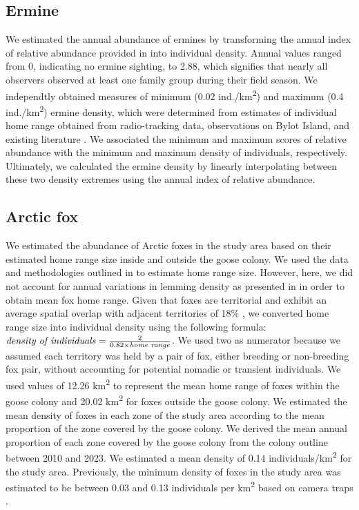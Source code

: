 \documentclass[a4paper,twoside,10pt]{article}
\begin{document}
\subsection{Ermine}
We estimated the annual abundance of ermines by transforming the annual index of relative abundance provided in \citet{bolduc2023} into individual density. Annual values ranged from 0, indicating no ermine sighting, to 2.88, which signifies that nearly all observers observed at least one family group during their field season. We independtly obtained measures of minimum (0.02 ind./km\textsuperscript{2}) and maximum (0.4 ind./km\textsuperscript{2}) ermine density, which were determined from estimates of individual home range obtained from radio-tracking data, observations on Bylot Island, and existing literature \citep{legagneux2012, bilodeau2013}. We associated the minimum and maximum scores of relative abundance with the minimum and maximum density of individuals, respectively. Ultimately, we calculated the ermine density by linearly interpolating between these two density extremes using the annual index of relative abundance. 

\subsection{Arctic fox} 
We estimated the abundance of Arctic foxes in the study area based on their estimated home range size inside and outside the goose colony. We used the data and methodologies outlined in \citet{dulude2023} to estimate home range size. However, here, we did not account for annual variations in lemming density as presented in \citet{dulude2023} in order to obtain mean fox home range. Given that foxes are territorial and exhibit an average spatial overlap with adjacent territories of 18\% \citep{clermont2021}, we converted home range size into individual density using the following formula: $\text{\textit{density of individuals}}= \frac{2}{0.82\times \text{\textit{home range}}}$. We used two as numerator because we assumed each territory was held by a pair of fox, either breeding or non-breeding fox pair, without accounting for potential nomadic or transient individuals. We used values of 12.26 km\textsuperscript{2} to represent the mean home range of foxes within the goose colony and 20.02 km\textsuperscript{2} for foxes outside the goose colony. We estimated the mean density of foxes in each zone of the study area according to the mean proportion of the zone covered by the goose colony. We derived the mean annual proportion of each zone covered by the goose colony from the colony outline between 2010 and 2023. We estimated a mean density of 0.14 individuals/km\textsuperscript{2} for the study area. Previously, the minimum density of foxes in the study area was estimated to be between 0.03 and 0.13 individuals per km\textsuperscript{2} based on camera traps \citep{royerboutin2015}. 
\newpage
\end{document}
